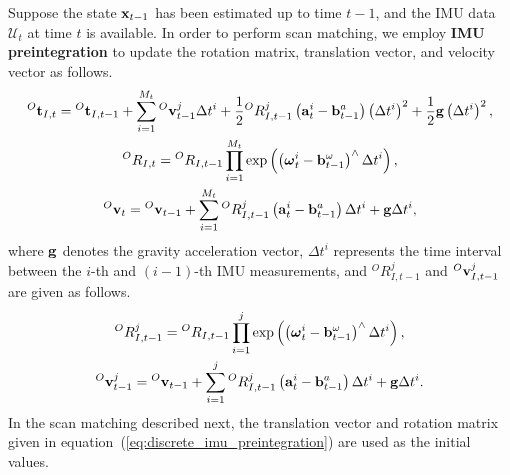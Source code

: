 Suppose the state ${\bf x}_{t-1}$ has been estimated up to time $t-1$, and the IMU data $\mathcal{U}_{t}$ at time $t$ is available.
In order to perform scan matching, we employ {\bf IMU preintegration} to update the rotation matrix, translation vector, and velocity vector as follows.
%
\begin{align}
  \begin{gathered}
    {}^{O}{\bf t}_{I, t} = {}^{O}{\bf t}_{I, t-1} + \sum_{i=1}^{M_{t}} {}^{O}{\bf v}_{t-1}^{j} \Delta t^{i} + \frac{1}{2} {}^{O}R_{I, t-1}^{j} \left( {\bf a}_{t}^{i} - {\bf b}_{t-1}^{a} \right) \left( \Delta t^{i} \right)^{2} + \frac{1}{2} {\bf g} \left( \Delta t^{i} \right)^{2}, \\
%
    {}^{O}R_{I, t} = {}^{O}R_{I, t-1} \prod_{i=1}^{M_{t}} \exp \left( \left( \boldsymbol \omega_{t}^{i} - {\bf b}_{t-1}^{\omega} \right)^{\wedge} \Delta t^{i} \right), \\
%
    {}^{O}{\bf v}_{t} = {}^{O}{\bf v}_{t-1} + \sum_{i=1}^{M_{t}} {}^{O}R_{I, t-1}^{j} \left( {\bf a}_{t}^{i} - {\bf b}_{t-1}^{a} \right) \Delta t^{i} + {\bf g} \Delta t^{i}, \\
  \end{gathered}
  \label{eq:discrete_imu_preintegration}
\end{align}
%
where ${\bf g}$ denotes the gravity acceleration vector, $\Delta t^{i}$ represents the time interval between the $i$-th and $(i-1)$-th IMU measurements, and ${}^{O}R_{I, t-1}^{j}$ and ${}^{O}{\bf v}_{I, t-1}^{j}$ are given as follows.
%
\begin{align}
  \begin{gathered}
    {}^{O}R_{I, t-1}^{j} = {}^{O}R_{I, t-1} \prod_{i=1}^{j} \exp \left( \left( \boldsymbol \omega_{t}^{i} - {\bf b}_{t-1}^{\omega} \right)^{\wedge} \Delta t^{i} \right), \\
%
    {}^{O}{\bf v}_{t-1}^{j} = {}^{O}{\bf v}_{t-1} + \sum_{i=1}^{j} {}^{O}R_{I, t-1}^{j} \left( {\bf a}_{t}^{i} - {\bf b}_{t-1}^{a} \right) \Delta t^{i} + {\bf g} \Delta t^{i}. \\
  \end{gathered}
\end{align}
%
In the scan matching described next, the translation vector and rotation matrix given in equation~(\ref{eq:discrete_imu_preintegration}) are used as the initial values.
















